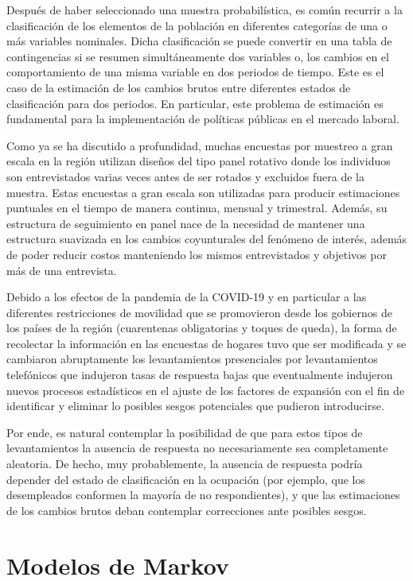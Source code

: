 \documentclass[
  12pt,
  spanish,
]{book}
\begin{document}
Después de haber seleccionado una muestra probabilística, es común recurrir a la clasificación de los elementos de la población en diferentes categorías de una o más variables nominales. Dicha clasificación se puede convertir en una tabla de contingencias si se resumen simultáneamente dos variables o, los cambios en el comportamiento de una misma variable en dos periodos de tiempo. Este es el caso de la estimación de los cambios brutos entre diferentes estados de clasificación para dos periodos. En particular, este problema de estimación es fundamental para la implementación de políticas públicas en el mercado laboral.

Como ya se ha discutido a profundidad, muchas encuestas por muestreo a gran escala en la región utilizan diseños del tipo panel rotativo donde los individuos son entrevistados varias veces antes de ser rotados y excluidos fuera de la muestra. Estas encuestas a gran escala son utilizadas para producir estimaciones puntuales en el tiempo de manera continua, mensual y trimestral. Además, su estructura de seguimiento en panel nace de la necesidad de mantener una estructura suavizada en los cambios coyunturales del fenómeno de interés, además de poder reducir costos manteniendo los mismos entrevistados y objetivos por más de una entrevista.

Debido a los efectos de la pandemia de la COVID-19 y en particular a las diferentes restricciones de movilidad que se promovieron desde los gobiernos de los países de la región (cuarentenas obligatorias y toques de queda), la forma de recolectar la información en las encuestas de hogares tuvo que ser modificada y se cambiaron abruptamente los levantamientos presenciales por levantamientos telefónicos que indujeron tasas de respuesta bajas que eventualmente indujeron nuevos procesos estadísticos en el ajuste de los factores de expansión con el fin de identificar y eliminar lo posibles sesgos potenciales que pudieron introducirse.

Por ende, es natural contemplar la posibilidad de que para estos tipos de levantamientos la ausencia de respuesta no necesariamente sea completamente aleatoria. De hecho, muy probablemente, la ausencia de respuesta podría depender del estado de clasificación en la ocupación (por ejemplo, que los desempleados conformen la mayoría de no respondientes), y que las estimaciones de los cambios brutos deban contemplar correcciones ante posibles sesgos.

\hypertarget{modelos-de-markov}{%
\section{Modelos de Markov}\label{modelos-de-markov}}
\end{document}
